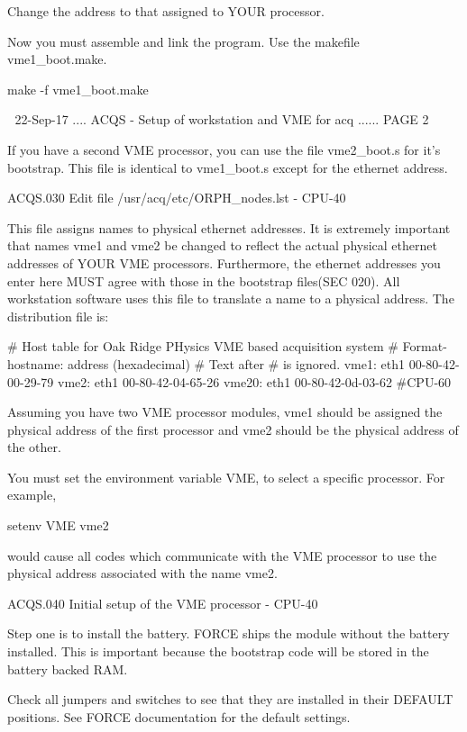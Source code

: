    Change the address to that assigned to YOUR processor.
 
   Now  you  must  assemble  and  link  the   program.    Use   the   makefile
   vme1_boot.make.
 
      make -f vme1_boot.make
 
    
   22-Sep-17 .... ACQS  - Setup of workstation and VME for acq ...... PAGE   2
 
   If  you  have  a second VME processor, you can use the file vme2_boot.s for
   it's bootstrap.  This file  is  identical  to  vme1_boot.s  except  for the
   ethernet address.
 
 
   ACQS.030  Edit file /usr/acq/etc/ORPH_nodes.lst - CPU-40
 
   This  file  assigns  names to physical ethernet addresses.  It is extremely
   important that names vme1  and  vme2  be  changed  to  reflect  the  actual
   physical  ethernet  addresses  of  YOUR  VME  processors.  Furthermore, the
   ethernet addresses you enter here MUST agree with those  in  the  bootstrap
   files(SEC  020).   All  workstation  software uses this file to translate a
   name to a physical address.  The distribution file is:
 
   #  Host table for Oak Ridge PHysics VME based acquisition system
   #   Format-  hostname: address (hexadecimal)
   #   Text after # is ignored.
   vme1:   eth1 00-80-42-00-29-79
   vme2:   eth1 00-80-42-04-65-26
   vme20:  eth1 00-80-42-0d-03-62       #CPU-60
 
   Assuming you have two VME processor modules, vme1 should  be  assigned  the
   physical  address  of  the  first processor and vme2 should be the physical
   address of the other.
 
   You must set the environment variable VME, to select a specific  processor.
   For example,
 
         setenv VME vme2
 
   would  cause  all codes which communicate with the VME processor to use the
   physical address associated with the name vme2.
 
 
   ACQS.040  Initial setup of the VME processor - CPU-40
 
   Step one is to install the battery.  FORCE  ships  the  module  without the
   battery  installed.   This  is important because the bootstrap code will be
   stored in the battery backed RAM.
 
   Check all jumpers and switches to see that  they  are  installed  in  their
   DEFAULT positions.  See FORCE documentation for the default settings.
 
